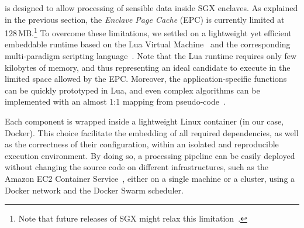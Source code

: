 \SYS is designed to allow processing of sensible data inside SGX enclaves.
As explained in the previous section, the \emph{Enclave Page Cache} (EPC) is currently limited at 128\,MB.\footnote{Note that future releases of SGX might relax this limitation~\cite{mckeen2016intel}.}
To overcome these limitations, we settled on a lightweight yet efficient embeddable runtime based on the Lua Virtual Machine~\cite{ierusalimschy_luaextensible_1996} and the corresponding multi-paradigm scripting language~\cite{lualang}.
Note that the Lua runtime requires only few kilobytes of memory, and thus representing an ideal candidate to execute in the limited space allowed by the EPC.
Moreover, the application-specific functions can be quickly prototyped in Lua, and even complex algorithms can be implemented with an almost 1:1 mapping from pseudo-code~\cite{leonini2009splay}.

Each component is wrapped inside a lightweight Linux container (in our case, Docker).
This choice facilitate the embedding of all required dependencies, as well as the correctness of their configuration, within an isolated and reproducible execution environment.
By doing so, a \SYS processing pipeline can be easily deployed without changing the source code on different infrastructures, such as the Amazon EC2 Container Service~\cite{awsec2container}, either on a single machine or a cluster, using a Docker network and the Docker Swarm\cite{docker:swarm_2016} scheduler.

